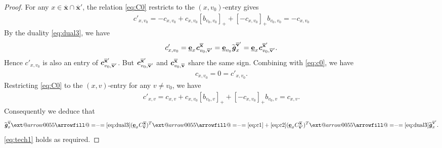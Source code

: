 \documentclass[11pt,reqno]{amsart}
\makeatletter
\providecommand{\reviewequalfill}{\arrowfill@=\relbar=}
\providecommand{\xlongequal}[2][]{\ext@arrow 0055\reviewequalfill{#1}{#2}}
\theoremstyle{plain}
\theoremstyle{definition}
\numberwithin{equation}{section}
\newcommand\<{\langle}
\renewcommand\>{\rangle}
\def\vv{\mathbf{v}}
\newcommand{\bfit}[1]{\textbf{\textit{#1}}}
\newcommand{\ubf}[1]{\underline{\mathbf{#1}}}
\def\xx{\mathbf{x}}%
\def\cvec{\bfit{c}}
\def\gvec{\bfit{g}}
\def\Cmat{{C}}
\def\Gmat{{G}}
\newcommand{\ol}[1]{\overline{#1}}
\def\tgvec{\widetilde{\gvec}}
\makeatother
\begin{document}
\begin{proof}

For any $x\in\ol{\xx}\cap\ol{\xx}'$, the relation \eqref{eq:C0} restricts to the $(x,v_0)$-entry gives
\begin{gather}\label{eq:c0}
    c'_{x,v_0} =
    -c_{x, v_0} + c_{x,v_0} [b_{v_0, v_0}]_+  + [-c_{x,v_0}]_+ b_{v_0, v_0}
    =-c_{x, v_0}
\end{gather}
By the duality \eqref{eq:dual3}, we have
\[
c'_{x,v_0}=\ubf{e}_{x}\cvec_{v_0,\ol{\vv}'}^{\ol{\xx}}
=\ubf{e}_{v_0}\widetilde{\gvec}_{x}^{\ol{\vv}'}
=\ubf{e}_{x}\cvec_{v_0,\ol{\vv}'}^{\ol{\xx}'}.
\]
Hence $c'_{x,v_0}$ is also an entry of $\cvec_{v_0,\ol{\vv}'}^{\ol{\xx}'}$.
But $\cvec_{v_0,\ol{\vv}'}^{\ol{\xx}'}$ and $\cvec_{v_0,\ol{\vv}}^{\ol{\xx}}$ share the same sign.
Combining with \eqref{eq:c0}, we have 
\begin{gather}\label{eq:c1}
    c_{x,v_0}=0=c'_{x,v_0}.   
\end{gather}
Restricting \eqref{eq:C0} to the $(x,v)$-entry for any $v\ne v_0$, we have
\begin{gather}\label{eq:c2}
     c'_{x,v} =
    c_{x, v} + c_{x,v_0} [b_{v_0, v}]_+ + [-c_{x,v_0}]_+ b_{v_0, v}
    =c_{x,v}.
\end{gather}
Consequently we deduce that
\[
\tgvec^{\ol\vv}_{x}\xlongequal{\eqref{eq:dual3}}
(\ubf{e}_{x}\Cmat^{\ol{\xx}}_{\ol{\vv}})^T\xlongequal{\eqref{eq:c1}+\eqref{eq:c2}}
(\ubf{e}_{x}\Cmat^{\ol{\xx}}_{\ol{\vv}'})^T\xlongequal{\eqref{eq:dual3}}
\tgvec^{\ol{\vv}'}_{x}.
\]
\eqref{eq:tech1} holds as required.
\end{proof}
\end{document}
